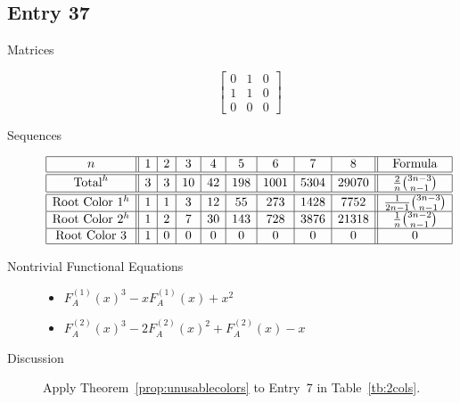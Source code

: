 \documentclass[12pt]{amsart}
\newcommand{\gff}[2]{F_{#2}^{(#1)}(x)}
\newcommand{\gfa}[1]{\gff{#1}{A}}
\begin{document}
\subsection*{Entry 37}
\begin{description}
    \item[Matrices]
    
    \[\begin{bmatrix}
0 & 1 & 0 \\
1 & 1 & 0 \\
0 & 0 & 0
\end{bmatrix}\]
    \item[Sequences]\hspace*{\fill}\vspace{-0.5cm}
    \begin{center}
        \[
        \begin{array}{|c||c|c|c|c|c|c|c|c||c|}\hline
           n  & 1 & 2 & 3 & 4 & 5 & 6 & 7 & 8  & \text{Formula}\\\hline\hline
           \text{Total}^{h}  & 3 & 3 & 10 & 42 & 198 & 1001 & 5304 & 29070 & 
           \frac{2}{n}\binom{3n-3}{n-1}\\\hline\hline
           \text{Root Color }1^h & 1 & 1 & 3 & 12 & 55 & 273 & 1428 & 7752 & \frac{1}{2n-1}\binom{3n-3}{n-1}\\\hline
           \text{Root Color }2^h & 1 & 2 & 7 & 30 & 143 & 728 & 3876 & 21318 & \frac{1}{n}\binom{3n-2}{n-1}\\\hline
           \text{Root Color }3 & 1 & 0 & 0 & 0 & 0 & 0 & 0 & 0 & 0\\\hline
        \end{array}
        \]
    \end{center}
    
    \item[Nontrivial Functional Equations]\hspace*{\fill}

    \begin{itemize}
\item $\gfa{1}^3-x\gfa{1}+x^2$

\item $\gfa{2}^3-2\gfa{2}^2+\gfa{2}-x$

\end{itemize}

\item[Discussion] Apply Theorem~\ref{prop:unusablecolors} to Entry~7 in Table~\ref{tb:2cols}.
    
\end{description}
\end{document}
